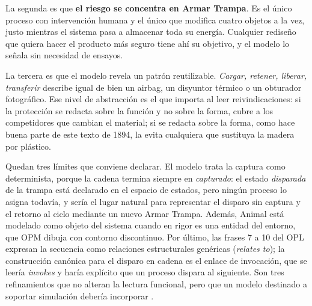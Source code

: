 \documentclass[11pt,letterpaper]{article}
\begin{document}
La segunda es que \textbf{el riesgo se concentra en Armar Trampa}. Es el único
proceso con intervención humana y el único que modifica cuatro objetos a la vez,
justo mientras el sistema pasa a almacenar toda su energía. Cualquier rediseño
que quiera hacer el producto más seguro tiene ahí su objetivo, y el modelo lo
señala sin necesidad de ensayos.

La tercera es que el modelo revela un patrón reutilizable. \emph{Cargar,
retener, liberar, transferir} describe igual de bien un airbag, un disyuntor
térmico o un obturador fotográfico. Ese nivel de abstracción es el que importa
al leer reivindicaciones: si la protección se redacta sobre la función y no sobre
la forma, cubre a los competidores que cambian el material; si se redacta sobre
la forma, como hace buena parte de este texto de 1894, la evita cualquiera que
sustituya la madera por plástico.

Quedan tres límites que conviene declarar. El modelo trata la captura como
determinista, porque la cadena termina siempre en \emph{capturado}: el estado
\emph{disparada} de la trampa está declarado en el espacio de estados, pero
ningún proceso lo asigna todavía, y sería el lugar natural para representar el
disparo sin captura y el retorno al ciclo mediante un nuevo Armar Trampa.
Además, Animal está modelado como objeto del sistema cuando en rigor es una
entidad del entorno, que OPM dibuja con contorno discontinuo. Por último, las
frases 7 a 10 del OPL expresan la secuencia como relaciones estructurales
genéricas (\emph{relates to}); la construcción canónica para el disparo en
cadena es el enlace de invocación, que se leería \emph{invokes} y haría explícito
que un proceso dispara al siguiente. Son tres refinamientos que no alteran la
lectura funcional, pero que un modelo destinado a soportar simulación debería
incorporar \parencite{dori2016,iso19450}.

\printbibliography[title={Referencias bibliográficas}]
\end{document}
